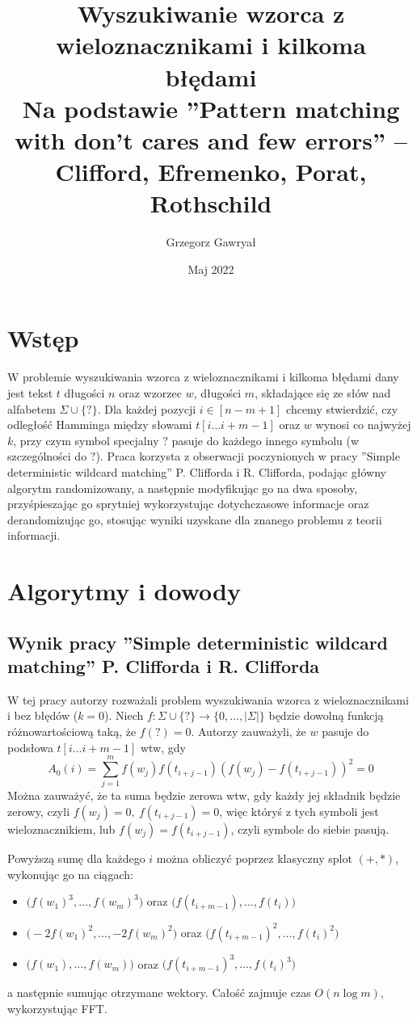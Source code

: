 \documentclass[a4paper,12pt]{article}
\title{Wyszukiwanie wzorca z wieloznacznikami i kilkoma błędami\\ \large Na podstawie ''Pattern matching with don't cares and few errors'' -- Clifford, Efremenko, Porat, Rothschild\cite{pattern_matching_with_dont_cares_and_few_errors}}
\author{Grzegorz Gawryał}
\date{Maj 2022}
\theoremstyle{definition}
\begin{document}
\maketitle

\section{Wstęp}
W problemie wyszukiwania wzorca z wieloznacznikami i kilkoma błędami dany jest tekst $t$ długości $n$ oraz wzorzec $w$, długości $m$, składające się ze słów nad alfabetem $\Sigma \cup \{?\}$. Dla każdej pozycji $i\in [n-m+1]$ chcemy stwierdzić, czy odległość Hamminga między słowami $t[i\dots i+m-1]$ oraz $w$ wynosi co najwyżej $k$, przy czym symbol specjalny $?$ pasuje do każdego innego symbolu (w szczególności do $?$). Praca korzysta z obserwacji poczynionych w pracy ''Simple deterministic wildcard matching'' P. Clifforda i R. Clifforda, podając główny algorytm randomizowany, a następnie modyfikując go na dwa sposoby, przyśpieszając go sprytniej wykorzystując dotychczasowe informacje oraz derandomizując go, stosując wyniki uzyskane dla znanego problemu z teorii informacji.

\section{Algorytmy i dowody}
\subsection{Wynik pracy ''Simple deterministic wildcard matching'' P. Clifforda i R. Clifforda}
W tej pracy autorzy rozważali problem  wyszukiwania wzorca z wieloznacznikami i bez błędów ($k=0$). Niech $f: \Sigma \cup \{?\} \to \{0,\dots, |\Sigma|\}$ będzie dowolną funkcją różnowartościową taką, że $f(?) = 0$.
Autorzy zauważyli, że $w$ pasuje do podsłowa $t[i\dots i+m-1]$ wtw, gdy 
\[A_0(i) = \sum_{j=1}^m f(w_j) f(t_{i+j-1})(f(w_j) - f(t_{i+j-1}))^2 = 0\]
Można zauważyć, że ta suma będzie zerowa wtw, gdy każdy jej składnik będzie zerowy, czyli $f(w_j) = 0,\ f(t_{i+j-1}) = 0$, więc któryś z tych symboli jest wieloznacznikiem, lub $f(w_j) = f(t_{i+j-1})$, czyli symbole do siebie pasują.

Powyższą sumę dla każdego $i$ można obliczyć poprzez klasyczny splot $(+, *)$, wykonując go na ciągach:
\begin{itemize}
    \item $\Big(f(w_1)^3, \dots, f(w_m)^3\Big)$ oraz $\Big(f(t_{i+m-1}), \dots, f(t_{i})\Big)$
    \item $\Big(-2f(w_1)^2, \dots, -2f(w_m)^2\Big)$ oraz $\Big(f(t_{i+m-1})^2, \dots, f(t_{i})^2\Big)$
    \item $\Big(f(w_1), \dots, f(w_m)\Big)$ oraz $\Big(f(t_{i+m-1})^3, \dots, f(t_{i})^3\Big)$
\end{itemize}
a następnie sumując otrzymane wektory. Całość zajmuje czas $O(n \log m)$, wykorzystując FFT.
\end{document}
